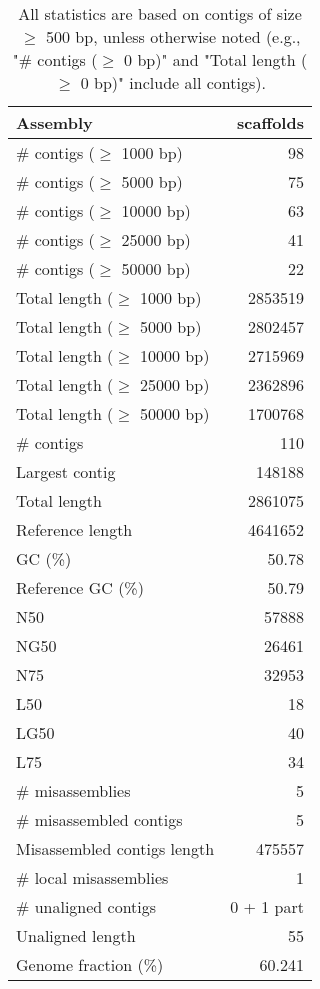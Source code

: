\documentclass[12pt,a4paper]{article}
\begin{document}
\begin{table}[ht]
\begin{center}
\caption{All statistics are based on contigs of size $\geq$ 500 bp, unless otherwise noted (e.g., "\# contigs ($\geq$ 0 bp)" and "Total length ($\geq$ 0 bp)" include all contigs).}
\begin{tabular}{|l*{1}{|r}|}
\hline
Assembly & scaffolds \\ \hline
\# contigs ($\geq$ 1000 bp) & 98 \\ \hline
\# contigs ($\geq$ 5000 bp) & 75 \\ \hline
\# contigs ($\geq$ 10000 bp) & 63 \\ \hline
\# contigs ($\geq$ 25000 bp) & 41 \\ \hline
\# contigs ($\geq$ 50000 bp) & 22 \\ \hline
Total length ($\geq$ 1000 bp) & 2853519 \\ \hline
Total length ($\geq$ 5000 bp) & 2802457 \\ \hline
Total length ($\geq$ 10000 bp) & 2715969 \\ \hline
Total length ($\geq$ 25000 bp) & 2362896 \\ \hline
Total length ($\geq$ 50000 bp) & 1700768 \\ \hline
\# contigs & 110 \\ \hline
Largest contig & 148188 \\ \hline
Total length & 2861075 \\ \hline
Reference length & 4641652 \\ \hline
GC (\%) & 50.78 \\ \hline
Reference GC (\%) & 50.79 \\ \hline
N50 & 57888 \\ \hline
NG50 & 26461 \\ \hline
N75 & 32953 \\ \hline
L50 & 18 \\ \hline
LG50 & 40 \\ \hline
L75 & 34 \\ \hline
\# misassemblies & 5 \\ \hline
\# misassembled contigs & 5 \\ \hline
Misassembled contigs length & 475557 \\ \hline
\# local misassemblies & 1 \\ \hline
\# unaligned contigs & 0 + 1 part \\ \hline
Unaligned length & 55 \\ \hline
Genome fraction (\%) & 60.241 \\ \hline

\end{tabular}
\end{center}
\end{table}
\end{document}

